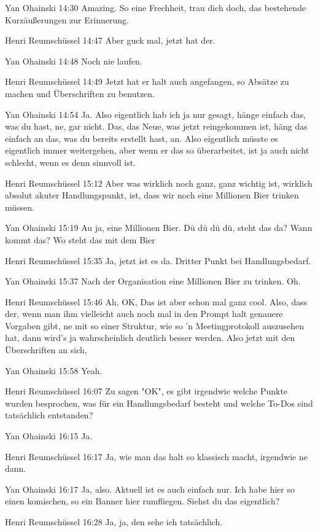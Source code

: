 Yan Ohainski   14:30
Amazing.
So eine Frechheit, trau dich doch, das bestehende Kurzäußerungen zur Erinnerung.

Henri Reumschüssel   14:47
Aber guck mal, jetzt hat der.

Yan Ohainski   14:48
Noch nie laufen.

Henri Reumschüssel   14:49
Jetzt hat er halt auch angefangen, so Absätze zu machen und Überschriften zu benutzen.

Yan Ohainski   14:54
Ja.
Also eigentlich hab ich ja nur gesagt, hänge einfach das, was du hast, ne, gar nicht. Das, das Neue, was jetzt reingekommen ist, häng das einfach an das, was du bereits erstellt hast, an. Also eigentlich müsste es eigentlich immer weitergehen, aber wenn er das so überarbeitet, ist ja auch nicht schlecht, wenn es denn sinnvoll ist.

Henri Reumschüssel   15:12
Aber was wirklich noch ganz, ganz wichtig ist, wirklich absolut akuter Handlungspunkt, ist, dass wir noch eine Millionen Bier trinken müssen.

Yan Ohainski   15:19
Au ja, eine Millionen Bier.
Dü dü dü dü, steht das da? Wann kommt das?
Wo steht das mit dem Bier

Henri Reumschüssel   15:35
Ja, jetzt ist es da. Dritter Punkt bei Handlungsbedarf.

Yan Ohainski   15:37
Nach der Organisation eine Millionen Bier zu trinken.
Oh.

Henri Reumschüssel   15:46
Ah, OK, Das ist aber schon mal ganz cool.
Also, dass der, wenn man ihm vielleicht auch noch mal in den Prompt halt genauere Vorgaben gibt, ne mit so einer Struktur, wie so 'n Meetingprotokoll auszusehen hat, dann wird's ja wahrscheinlich deutlich besser werden. Also jetzt mit den Überschriften an sich,

Yan Ohainski   15:58
Yeah.

Henri Reumschüssel   16:07
Zu sagen "OK", es gibt irgendwie welche Punkte wurden besprochen, was für ein Handlungsbedarf besteht und welche To-Dos sind tatsächlich entstanden?

Yan Ohainski   16:15
Ja.

Henri Reumschüssel   16:17
Ja, wie man das halt so klassisch macht, irgendwie ne dann.

Yan Ohainski   16:17
Ja, also.
Aktuell ist es auch einfach nur. Ich habe hier so einen komischen, so ein Banner hier rumfliegen. Siehst du das eigentlich?

Henri Reumschüssel   16:28
Ja, ja, den sehe ich tatsächlich.

